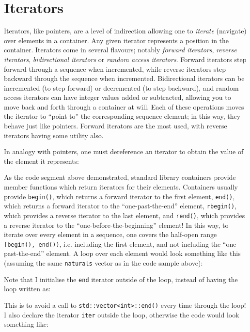 \documentclass[a4paper]{scrartcl}
\begin{document}
\section{Iterators}\label{sec:iter}
Iterators, like pointers, are a level of indirection allowing one to \emph{iterate} (navigate) over elements in a container. Any given iterator represents a position in the container. Iterators come in several flavours; notably \emph{forward iterators}, \emph{reverse iterators}, \emph{bidirectional iterators} or \emph{random access iterators}. Forward iterators step forward through a sequence when incremented, while reverse iterators step backward through the sequence when incremented. Bidirectional iterators can be incremented (to step forward) or decremented (to step backward), and random access iterators can have integer values added or subtracted, allowing you to move back and forth through a container at will. Each of these operations moves the iterator to ``point to'' the corresponding sequence element; in this way, they behave just like pointers. Forward iterators are the most used, with reverse iterators having some utility also.

In analogy with pointers, one must dereference an iterator to obtain the value of the element it represents:



As the code segment above demonstrated, standard library containers provide member functions which return iterators for their elements. Containers usually provide \verb|begin()|, which returns a forward iterator to the first element, \verb|end()|, which returns a forward iterator to the ``one-past-the-end'' element, \verb|rbegin()|, which provides a reverse iterator to the last element, and \verb|rend()|, which provides a reverse iterator to the ``one-before-the-beginning'' element! In this way, to iterate over every element in a sequence, one covers the half-open range \verb|[begin(), end())|, i.e. including the first element, and not including the ``one-past-the-end'' element. A loop over each element would look something like this (assuming the same \verb|naturals| vector as in the code sample above):



Note that I initialise the \verb|end| iterator outside of the loop, instead of having the loop written as:



This is to avoid a call to \verb|std::vector<int>::end()| every time through the loop! I also declare the iterator \verb|iter| outside the loop, otherwise the code would look something like:
\end{document}

